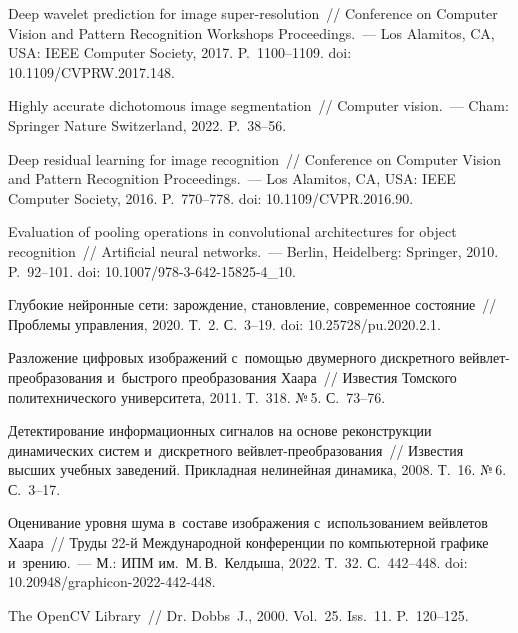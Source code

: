 \begin{multicols}{2}
{{\begin{thebibliography}{99}
      Deep wavelet prediction for image super-resolution~// 
 Conference on Computer Vision and Pattern Recognition Workshops 
Proceedings.~--- Los Alamitos, CA, USA: IEEE Computer Society, 2017. P.~1100--1109. 
doi: 10.1109/CVPRW.2017.148.
    
    Highly accurate dichotomous image segmentation~// Computer vision.~--- Cham: Springer Nature Switzerland, 2022. P.~38--56.
    
    Deep residual learning for image recognition~// Conference on 
Computer Vision and Pattern Recognition Proceedings.~--- Los Alamitos, CA, USA: IEEE 
Computer Society, 2016. P.~770--778. doi: 10.1109/CVPR.2016.90.
    
    Evaluation of pooling operations in convolutional architectures for object 
recognition~// Artificial neural networks.~--- Berlin, Heidelberg: 
Springer,   2010. P.~92--101. doi: 10.1007/978-3-642-15825-4\_10.
 
   Глубокие нейронные сети: за\-рож\-де\-ние, 
становление,     современное состояние~// Проб\-ле\-мы управ\-ле\-ния, 2020. Т.~2. 
С.~3--19. doi: 10.25728/pu.2020.2.1.
  
     Разложение 
цифровых     изоб\-ра\-же\-ний с~по\-мощью двумерного дискретного вейв\-лет-пре\-обра\-зо\-ва\-ния и~быст\-ро\-го   преобразования \mbox{Хаара}~// Известия Томского 
политехнического университета, 2011. Т.~318. №\,5. С.~73--76.
    
     Детектирование информационных сигналов на 
основе   реконструкции динамических сис\-тем и~дискретного вейв\-лет-пре\-обра\-зо\-ва\-ния~//\linebreak
 Известия  высших учебных заведений. Прикладная нелинейная 
динамика, 2008. Т.~16. №\,6. С.~3--17.

 Оценивание уровня шума в~составе изоб\-ра\-же\-ния с~использованием вейвлетов Хаара~// Труды 22-й Международной 
конференции по  компьютерной графике и~зрению.~---    М.: ИПМ им.\ М.\,В.~Келдыша, 2022.
 Т.~32. С.~442--448. doi: 
10.20948/graphicon-2022-442-448.
   
     The OpenCV Library~// Dr. Dobbs~J., 2000. Vol.~25. Iss.~11. P.~120--125.
    

\end{thebibliography}}}
\end{multicols}
